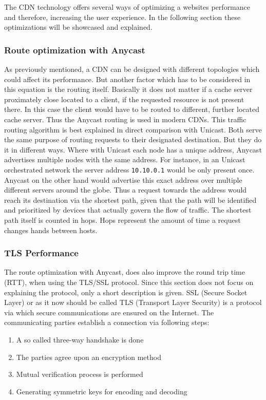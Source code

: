 The CDN technology offers several ways of optimizing a websites performance and therefore, increasing the user experience. In the following section these optimizations will be showcased and explained.

\subsubsection{Route optimization with Anycast}

As previously mentioned, a CDN can be designed with different topologies which could affect its performance. But another factor which has to be considered in this equation is the routing itself. Basically it does not matter if a cache server proximately close located to a client, if the requested resource is not present there. In this case the client would have to be routed to different, further located cache server. 
Thus the Anycast routing is used in modern CDNs. This traffic routing algorithm is best explained in direct comparison with Unicast. Both serve the same purpose of routing requests to their designated destination. But they do it in different ways. Where with Unicast each node has a unique address, Anycast advertises multiple nodes with the same address.
For instance, in an Unicast orchestrated network the server address \texttt{10.10.0.1} would be only present once. Anycast on the other hand would advertise this exact address over multiple different servers around the globe. Thus a request towards the address would reach its destination via the shortest path, given that the path will be identified and prioritized by devices that actually govern the flow of traffic.
The shortest path itself is counted in hops. Hops represent the amount of time a request changes hands between hosts.\cite{cdn_route_opt}

\subsubsection{TLS Performance}

The route optimization with Anycast, does also improve the round trip time (RTT), when using the TLS/SSL protocol. Since this section does not focus on explaining the protocol, only a short description is given.
SSL (Secure Socket Layer) or as it now should be called TLS (Transport Layer Security) is a protocol via which secure communications are ensured on the Internet. The communicating parties establish a connection via following steps:

\begin{enumerate}[noitemsep]
	\item A so called three-way handshake is done
	\item The parties agree upon an encryption method
	\item Mutual verification process is performed
	\item Generating symmetric keys for encoding and decoding	
\end{enumerate}

